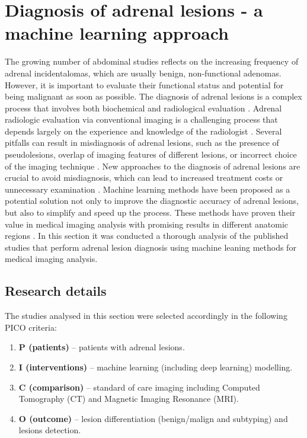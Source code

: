 \documentclass{article}
\begin{document}
\section{Diagnosis of adrenal lesions - a machine learning approach}

The growing number of abdominal studies reflects on the increasing frequency of
adrenal incidentalomas, which are usually benign, non-functional adenomas.
However, it is important to evaluate their functional status and potential for
being malignant as soon as possible. The diagnosis of adrenal lesions is a
complex process that involves both biochemical and radiological evaluation
\cite{Anagnostis2009}. Adrenal radiologic evaluation via conventional imaging is
a challenging process that depends largely on the experience and knowledge of
the radiologist \cite{Zhang2022}. Several pitfalls can result in misdiagnosis of
adrenal lesions, such as the presence of pseudolesions, overlap of imaging
features of different lesions, or incorrect choice of the imaging technique
\cite{Elsayes2020}. New approaches to the diagnosis of adrenal lesions are
crucial to avoid misdiagnosis, which can lead to increased treatment costs or
unnecessary examination \cite{Zhang2022}. Machine learning methods have been
proposed as a potential solution not only to improve the diagnostic accuracy of
adrenal lesions, but also to simplify and speed up the process. These methods
have proven their value in medical imaging analysis with promising results in
different anatomic regions \cite{Suganyadevi2022, Avanzo2020}. In this section
it was conducted a thorough analysis of the published studies that perform
adrenal lesion diagnosis using machine leaning methods for medical imaging
analysis.
\subsection{Research details}

The studies analysed in this section were selected accordingly in the following PICO criteria:

\begin{enumerate}
    \item[] \textbf{P (patients) }– patients with adrenal lesions.
    \item[] \textbf{I (interventions) }– machine learning (including deep learning) modelling.
    \item[] \textbf{C (comparison) }– standard of care imaging including Computed Tomography (CT) and Magnetic Imaging Resonance (MRI).
    \item[] \textbf{O (outcome) }– lesion differentiation (benign/malign and subtyping) and lesions detection.
\end{enumerate}
\end{document}
